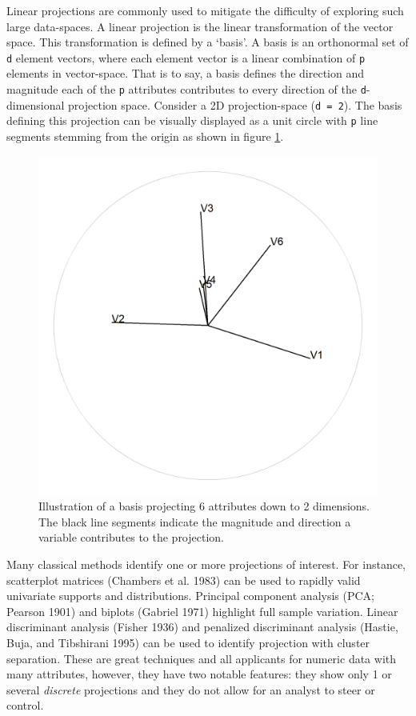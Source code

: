 \documentclass[
  11,
]{article}
\begin{document}
Linear projections are commonly used to mitigate the difficulty of exploring such large data-spaces. A linear projection is the linear transformation of the vector space. This transformation is defined by a `basis'. A basis is an orthonormal set of \texttt{d} element vectors, where each element vector is a linear combination of \texttt{p} elements in vector-space. That is to say, a basis defines the direction and magnitude each of the \texttt{p} attributes contributes to every direction of the \texttt{d}-dimensional projection space. Consider a 2D projection-space (\texttt{d\ =\ 2}). The basis defining this projection can be visually displayed as a unit circle with \texttt{p} line segments stemming from the origin as shown in figure \ref{fig:basis}.

\begin{figure}[h]

{\centering \includegraphics[width=0.6\linewidth,]{./figures/basis} 

}

\caption{Illustration of a basis projecting 6 attributes down to 2 dimensions. The black line segments indicate the magnitude and direction a variable contributes to the projection.}\label{fig:basis}
\end{figure}

Many classical methods identify one or more projections of interest. For instance, scatterplot matrices (Chambers et al. 1983) can be used to rapidly valid univariate supports and distributions. Principal component analysis (PCA; Pearson 1901) and biplots (Gabriel 1971) highlight full sample variation. Linear discriminant analysis (Fisher 1936) and penalized discriminant analysis (Hastie, Buja, and Tibshirani 1995) can be used to identify projection with cluster separation. These are great techniques and all applicants for numeric data with many attributes, however, they have two notable features: they show only 1 or several \emph{discrete} projections and they do not allow for an analyst to steer or control.
\end{document}
